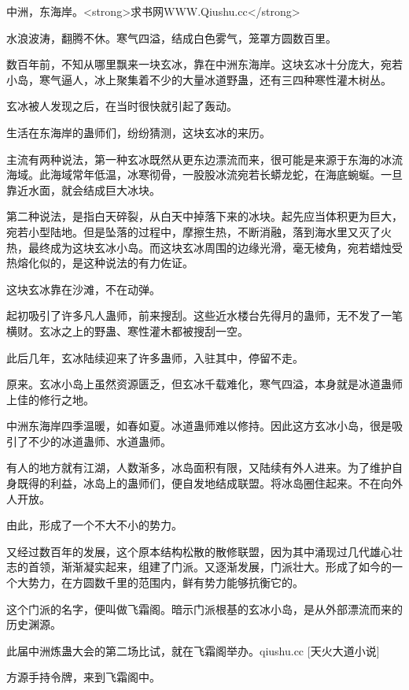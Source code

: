
\begin{this_body}

中洲，东海岸。<strong>求书网WWW.Qiushu.cc</strong>

水浪波涛，翻腾不休。寒气四溢，结成白色雾气，笼罩方圆数百里。

数百年前，不知从哪里飘来一块玄冰，靠在中洲东海岸。这块玄冰十分庞大，宛若小岛，寒气逼人，冰上聚集着不少的大量冰道野蛊，还有三四种寒性灌木树丛。

玄冰被人发现之后，在当时很快就引起了轰动。

生活在东海岸的蛊师们，纷纷猜测，这块玄冰的来历。

主流有两种说法，第一种玄冰既然从更东边漂流而来，很可能是来源于东海的冰流海域。此海域常年低温，冰寒彻骨，一股股冰流宛若长蟒龙蛇，在海底蜿蜒。一旦靠近水面，就会结成巨大冰块。

第二种说法，是指白天碎裂，从白天中掉落下来的冰块。起先应当体积更为巨大，宛若小型陆地。但是坠落的过程中，摩擦生热，不断消融，落到海水里又灭了火热，最终成为这块玄冰小岛。而这块玄冰周围的边缘光滑，毫无棱角，宛若蜡烛受热熔化似的，是这种说法的有力佐证。

这块玄冰靠在沙滩，不在动弹。

起初吸引了许多凡人蛊师，前来搜刮。这些近水楼台先得月的蛊师，无不发了一笔横财。玄冰之上的野蛊、寒性灌木都被搜刮一空。

此后几年，玄冰陆续迎来了许多蛊师，入驻其中，停留不走。

原来。玄冰小岛上虽然资源匮乏，但玄冰千载难化，寒气四溢，本身就是冰道蛊师上佳的修行之地。

中洲东海岸四季温暖，如春如夏。冰道蛊师难以修持。因此这方玄冰小岛，很是吸引了不少的冰道蛊师、水道蛊师。

有人的地方就有江湖，人数渐多，冰岛面积有限，又陆续有外人进来。为了维护自身既得的利益，冰岛上的蛊师们，便自发地结成联盟。将冰岛圈住起来。不在向外人开放。

由此，形成了一个不大不小的势力。

又经过数百年的发展，这个原本结构松散的散修联盟，因为其中涌现过几代雄心壮志的首领，渐渐凝实起来，组建了门派。又逐渐发展，门派壮大。形成了如今的一个大势力，在方圆数千里的范围内，鲜有势力能够抗衡它的。

这个门派的名字，便叫做飞霜阁。暗示门派根基的玄冰小岛，是从外部漂流而来的历史渊源。

此届中洲炼蛊大会的第二场比试，就在飞霜阁举办。qiushu.cc [天火大道小说]

方源手持令牌，来到飞霜阁中。


\end{this_body}
